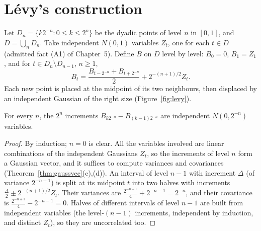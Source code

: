 \section{L\'evy's construction}

Let $D_n=\{k2^{-n}:0\le k\le2^n\}$ be the dyadic points of level $n$ in $[0,1]$, and $D=\bigcup_nD_n$. Take independent $N(0,1)$ variables $Z_t$, one for each $t\in D$
(admitted fact (A1) of Chapter~5). Define $B$ on $D$ level by level: $B_0=0$, $B_1=Z_1$, and for $t\in D_n\setminus D_{n-1}$, $n\ge1$,
\[
B_t=\frac{B_{t-2^{-n}}+B_{t+2^{-n}}}2+2^{-(n+1)/2}Z_t.
\]
Each new point is placed at the midpoint of its two neighbours, then displaced by an independent Gaussian of the right
size (Figure~\ref{fig:levy}).

\begin{lemma}\label{lem:levylevel}
For every $n$, the $2^n$ increments $B_{k2^{-n}}-B_{(k-1)2^{-n}}$ are independent $N(0,2^{-n})$ variables.
\end{lemma}
\begin{proof}
By induction; $n=0$ is clear. All the variables involved are linear combinations of the independent Gaussians $Z_t$, so the
increments of level $n$ form a Gaussian vector, and it suffices to compute variances and covariances
(Theorem~\ref{thm:gaussvec}(c),(d)). An interval of level $n-1$ with increment $\Delta$ (of variance $2^{-n+1}$) is split at its midpoint $t$ into two halves with
increments $\frac\Delta2\pm2^{-(n+1)/2}Z_t$. Their variances are $\frac{2^{-n+1}}4+2^{-n-1}=2^{-n}$, and their covariance is $\frac{2^{-n+1}}4-2^{-n-1}=0$. Halves of different intervals of
level $n-1$ are built from independent variables (the level-$(n-1)$ increments, independent by induction, and distinct $Z_t$), so they are
uncorrelated too.
\end{proof}

